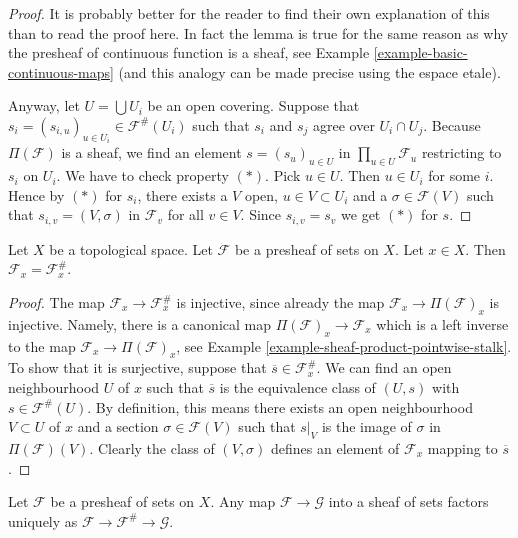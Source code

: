 \begin{proof}
It is probably better for the reader to find their own explanation
of this than to read the proof here. In fact the lemma is true
for the same reason as why the presheaf of continuous
function is a sheaf, see Example \ref{example-basic-continuous-maps}
(and this analogy can be made precise using the espace etale).

\medskip\noindent
Anyway, let $U = \bigcup U_i$ be an open covering.
Suppose that $s_i = (s_{i, u})_{u \in U_i} \in \mathcal{F}^{\#}(U_i)$
such that $s_i$ and $s_j$ agree over $U_i \cap U_j$.
Because $\Pi(\mathcal{F})$ is a sheaf,
we find an element $s = (s_u)_{u\in U}$ in $\prod_{u\in U} \mathcal{F}_u$
restricting to $s_i$ on $U_i$. We have to check property $(*)$.
Pick $u \in U$. Then $u \in U_i$ for some $i$. Hence by $(*)$ for $s_i$,
there exists a $V$ open, $u \in V \subset U_i$
and a $\sigma \in \mathcal{F}(V)$
such that $s_{i, v} = (V, \sigma)$ in $\mathcal{F}_v$
for all $v \in V$. Since $s_{i, v} = s_v$ we get $(*)$ for $s$.
\end{proof}

\begin{lemma}
\label{lemma-stalk-sheafification}
Let $X$ be a topological space.
Let $\mathcal{F}$ be a presheaf of sets on $X$.
Let $x \in X$. Then $\mathcal{F}_x = \mathcal{F}^\#_x$.
\end{lemma}

\begin{proof}
The map $\mathcal{F}_x \to \mathcal{F}^\#_x$
is injective, since already the map
$\mathcal{F}_x \to \Pi(\mathcal{F})_x$ is injective.
Namely, there is a canonical map $\Pi(\mathcal{F})_x \to \mathcal{F}_x$
which is a left inverse to the map $\mathcal{F}_x \to \Pi(\mathcal{F})_x$,
see Example \ref{example-sheaf-product-pointwise-stalk}.
To show that it is surjective, suppose that
$\overline{s} \in \mathcal{F}^\#_x$.
We can find an open neighbourhood $U$ of $x$ such that
$\overline{s}$ is the equivalence class of $(U, s)$
with $s \in \mathcal{F}^\#(U)$.
By definition, this means there exists an open neighbourhood
$V \subset U$ of $x$ and a section $\sigma \in \mathcal{F}(V)$
such that $s|_V$ is the image of $\sigma$ in $\Pi(\mathcal{F})(V)$.
Clearly the class of $(V, \sigma)$ defines an element of
$\mathcal{F}_x$ mapping to $\overline{s}$.
\end{proof}

\begin{lemma}
\label{lemma-sheafifiy-universal}
Let $\mathcal{F}$ be a presheaf of sets on $X$.
Any map $\mathcal{F} \to \mathcal{G}$ into a sheaf of sets
factors uniquely as
$\mathcal{F} \to \mathcal{F}^\# \to \mathcal{G}$.
\end{lemma}

